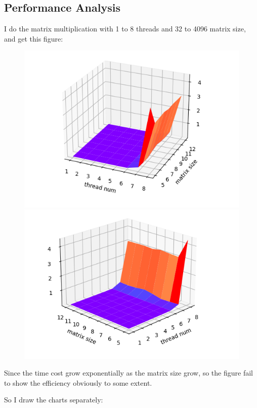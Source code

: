 \documentclass[]{article}
\begin{document}
\subsection*{Performance Analysis}
I do the matrix multiplication with 1 to 8 threads and 32 to 4096 matrix size, and get this figure:
\begin{figure}[H]
    \includegraphics[scale = 0.6]{2023-03-25-13-46-38.png}
    \includegraphics[scale = 0.6]{2023-03-25-13-47-06.png}
\end{figure}
Since the time cost grow exponentially as the matrix size grow, so the figure fail to show the efficiency obviously to some extent.\par 
So I draw the charts separately:
\end{document}
